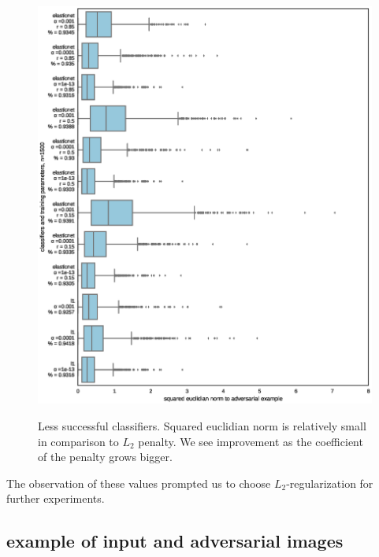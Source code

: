 \documentclass{article} %
\begin{document}
\begin{figure}[h!]

\begin{center}
\includegraphics[scale=0.5]{figs/sup_1}
\label{exp:sup_2}
\end{center}
\caption{\small Less successful classifiers. Squared euclidian norm is relatively small in comparison to $L_2$ penalty. We see improvement as the coefficient of the penalty grows bigger.}
\end{figure}

The observation of these values prompted us to choose $L_2$-regularization for further experiments.

\null
\vfill
\newpage

\subsection{example of input and adversarial images}
\end{document}
